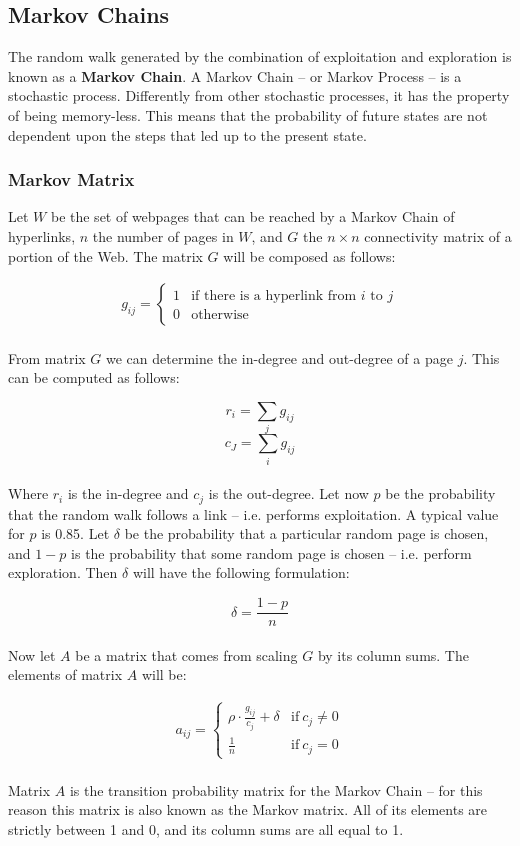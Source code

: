 \documentclass{article}
\begin{document}
\subsection{Markov Chains}
The random walk generated by the combination of exploitation and exploration is known as a \textbf{Markov Chain}. A Markov Chain -- or Markov Process -- is a stochastic process. Differently from other stochastic processes, it has the property of being memory-less. This means that the probability of future states are not dependent upon the steps that led up to the present state.

\subsubsection{Markov Matrix}
Let $W$ be the set of webpages that can be reached by a Markov Chain of hyperlinks, $n$ the number of pages in $W$, and $G$ the $n \times n$ connectivity matrix of a portion of the Web. The matrix $G$ will be composed as follows:

\begin{align*}
	g_{ij} = \begin{cases} 1 & \text{if there is a hyperlink from $i$ to $j$} \\ 0 & \text{otherwise} \end{cases}
\end{align*} \\
From matrix $G$ we can determine the in-degree and out-degree of a page $j$. This can be computed as follows:

\[ r_i = \sum_j g_{ij} \]
\[ c_J = \sum_i g_{ij} \] \\
Where $r_i$ is the in-degree and $c_j$ is the out-degree. Let now $p$ be the probability that the random walk follows a link -- i.e. performs exploitation. A typical value for $p$ is 0.85. Let $\delta$ be the probability that a particular random page is chosen, and $1-p$ is the probability that some random page is chosen -- i.e. perform exploration. Then $\delta$ will have the following formulation:

\[ \delta = \frac{1-p}{n} \] \\
Now let $A$ be a matrix that comes from scaling $G$ by its column sums. The elements of matrix $A$ will be:

\begin{align*}
	a_{ij} = \begin{cases} \rho \cdot \frac{g_{ij}}{c_j} + \delta & \text{if}~c_j \neq 0 \\ \frac{1}{n} & \text{if}~ c_j = 0 \end{cases}
\end{align*} \\
Matrix $A$ is the transition probability matrix for the Markov Chain -- for this reason this matrix is also known as the Markov matrix. All of its elements are strictly between 1 and 0, and its column sums are all equal to 1.
\end{document}
